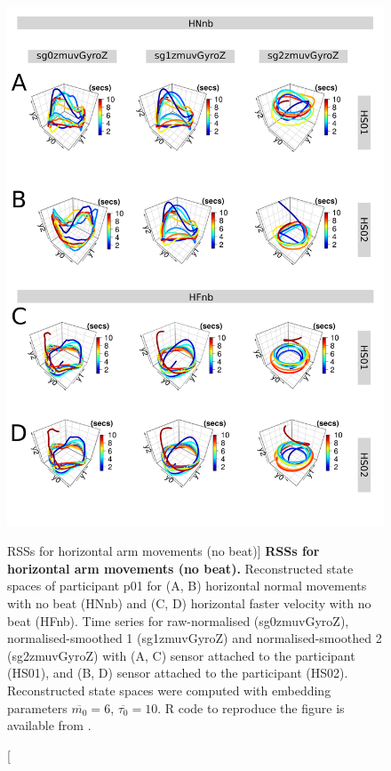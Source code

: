 \begin{figure}
\centering
\includegraphics[height=0.8\textheight]{fig_5_05}
\caption
	[RSSs for horizontal arm movements (no beat)]{
	{\bf RSSs for horizontal arm movements (no beat).}
	Reconstructed state spaces of participant p01 for 
	(A, B) horizontal normal movements with no beat (HNnb) and 
	(C, D) horizontal faster velocity with no beat (HFnb).
	Time series for raw-normalised (sg0zmuvGyroZ), 
	normalised-smoothed 1 (sg1zmuvGyroZ) and 
	normalised-smoothed 2 (sg2zmuvGyroZ) with
	(A, C) sensor attached to the participant (HS01), and
	(B, D) sensor attached to the participant (HS02).	
	Reconstructed state spaces were computed with 
	embedding parameters $\overline{m_0}=6$, $\overline{\tau_0}=10$.
	R code to reproduce the figure is available from \cite{xochicale2018}.
        }
     \label{fig:rss_Hnb_w500}
\end{figure}

